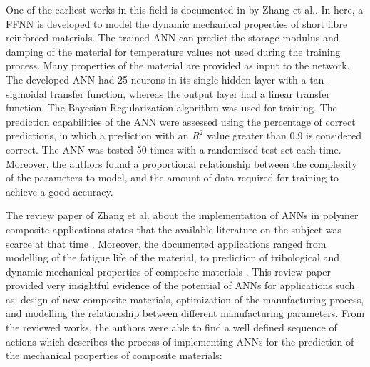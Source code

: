 One of the earliest works in this field is documented in \cite{zhang2002dynamic} by Zhang et al.. In here, a FFNN is developed to model the dynamic mechanical properties of short fibre reinforced materials. The trained ANN can predict the storage modulus and damping of the material for temperature values not used during the training process. Many properties of the material are provided as input to the network. The developed ANN had 25 neurons in its single hidden layer with a tan-sigmoidal transfer function, whereas the output layer had a linear transfer function. The Bayesian Regularization algorithm was used for training. The prediction capabilities of the ANN were assessed using the percentage of correct predictions, in which a prediction with an $R^2$ value greater than 0.9 is considered correct. The ANN was tested 50 times with a randomized test set each time. Moreover, the authors found a proportional relationship between the complexity of the parameters to model, and the amount of data required for training to achieve a good accuracy.

The review paper of Zhang et al. about the implementation of ANNs in polymer composite applications states that the available literature on the subject was scarce at that time \cite{zhang2003artificial}. Moreover, the documented applications ranged from modelling of the fatigue life of the material, to prediction of tribological and dynamic mechanical properties of composite materials \cite{zhang2002prediction,zhang2002dynamic}. This review paper provided very insightful evidence of the potential of ANNs for applications such as: design of new composite materials, optimization of the manufacturing process, and modelling the relationship between different manufacturing parameters. From the reviewed works, the authors were able to find a well defined sequence of actions which describes the process of implementing ANNs for the prediction of the mechanical properties of composite materials:

